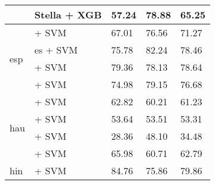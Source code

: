 \begin{table*}[ht]
\begin{tabular}{@{}llp{1.1cm}p{1.1cm}p{1.1cm}@{}}
                                           & \citep{zhang2025jasperstelladistillationsota} Stella + XGB         & 57.24                           & 78.88                              & 65.25                             \\
        \midrule
        \multirow{4}{*}{esp}               & \citep{CaneteCFP2020}  + SVM                                       & 67.01                           & 76.56                              & 71.27                             \\
                                           & \citep{mohr2024multi} es + SVM                                     & 75.78                           & 82.24                              & 78.46                             \\
                                           & \citep{sturua2024jinaembeddingsv3multilingualembeddingstask} + SVM & 79.36                           & 78.13                              & 78.64                             \\
                                           & \citep{romero2023multilinguale5largeftstsspanish} + SVM            & 74.98                           & 79.15                              & 76.68                             \\
        \midrule
        \multirow{4}{*}{hau}               & \citep{wang2024multilingual}  + SVM                                & 62.82                           & 60.21                              & 61.23                             \\
                                           & \citep{sturua2024jinaembeddingsv3multilingualembeddingstask} + SVM & 53.64                           & 53.51                              & 53.31                             \\
                                           & \citep{oketunji2024pmmlv2finetunedhausa} + SVM                     & 28.36                           & 48.10                              & 34.48                             \\
                                           & \citep{dobler-demelo-2023-focus} + SVM                             & 65.98                           & 60.71                              & 62.79                             \\
        \midrule
        \multirow{5}{*}{hin}               & \citep{sukhlecha_2024_bhasha_embed_v0} + SVM                       & 84.76                           & 75.86                              & 79.86                             \\

\end{tabular}
\end{table*}
